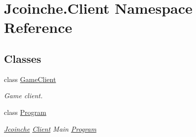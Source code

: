 \hypertarget{namespace_jcoinche_1_1_client}{}\section{Jcoinche.\+Client Namespace Reference}
\label{namespace_jcoinche_1_1_client}
\subsection*{Classes}
\begin{DoxyCompactItemize}
\item 
class \hyperlink{class_jcoinche_1_1_client_1_1_game_client}{Game\+Client}
\begin{DoxyCompactList}\small\item\em Game client. \end{DoxyCompactList}\item 
class \hyperlink{class_jcoinche_1_1_client_1_1_program}{Program}
\begin{DoxyCompactList}\small\item\em \hyperlink{namespace_jcoinche}{Jcoinche} \hyperlink{namespace_jcoinche_1_1_client}{Client} Main \hyperlink{class_jcoinche_1_1_client_1_1_program}{Program} \end{DoxyCompactList}\end{DoxyCompactItemize}
